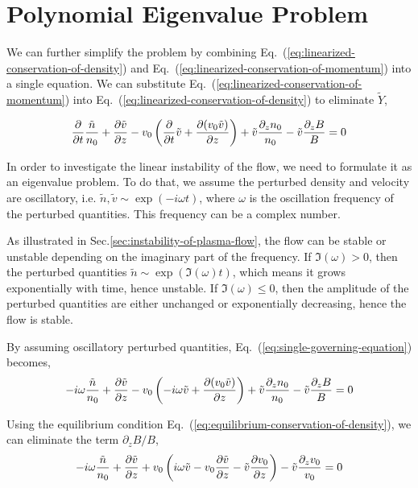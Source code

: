 \section{Polynomial Eigenvalue Problem}
We can further simplify the problem by combining Eq.~(\ref{eq:linearized-conservation-of-density}) and Eq.~(\ref{eq:linearized-conservation-of-momentum}) into a single equation. We can substitute Eq.~(\ref{eq:linearized-conservation-of-momentum}) into Eq.~(\ref{eq:linearized-conservation-of-density}) to eliminate $\tilde{Y}$,

\begin{equation} \label{eq:single-governing-equation}
	\pdv{t}\frac{\tilde{n}}{n_0}
	+ \pdv{\tilde{v}}{z} - v_0\left(\pdv{t}\tilde{v}
	+ \pdv{(v_0\tilde{v})}{z}\right)
	+ \tilde{v}\frac{\partial_z n_0}{n_0}
	- \tilde{v}\frac{\partial_z B}{B}
	= 0
\end{equation}

In order to investigate the linear instability of the flow, we need to formulate it as an eigenvalue problem. To do that, we assume the perturbed density and velocity are oscillatory, i.e. $\tilde{n}, \tilde{v} \sim \exp(-i\omega t)$, where $\omega$ is the oscillation frequency of the perturbed quantities. This frequency can be a complex number.

As illustrated in Sec.\ref{sec:instability-of-plasma-flow}, the flow can be stable or unstable depending on the imaginary part of the frequency. If $\Im(\omega) > 0$, then the perturbed quantities $\tilde{n} \sim \exp(\Im(\omega) t)$, which means it grows exponentially with time, hence unstable. If $\Im(\omega) \leq 0$, then the amplitude of the perturbed quantities are either unchanged or exponentially decreasing, hence the flow is stable.

By assuming oscillatory perturbed quantities, Eq.~(\ref{eq:single-governing-equation}) becomes,
\begin{equation}
	-i\omega\frac{\tilde{n}}{n_0}
	+ \pdv{\tilde{v}}{z} - v_0\left(-i\omega\tilde{v}
	+ \pdv{(v_0\tilde{v})}{z}\right)
	+ \tilde{v}\frac{\partial_z n_0}{n_0}
	- \tilde{v}\frac{\partial_z B}{B}
	= 0
\end{equation}

Using the equilibrium condition Eq.~(\ref{eq:equilibrium-conservation-of-density}), we can eliminate the term $\partial_z B/B$,
\[
	-i\omega\frac{\tilde{n}}{n_0}
	+ \pdv{\tilde{v}}{z}
	+ v_0\left(i\omega \tilde{v} - v_0\pdv{\tilde{v}}{z} - \tilde{v}\pdv{v_0}{z} \right)
	- \tilde{v}\frac{\partial_z v_0}{v_0}
	= 0
\]

